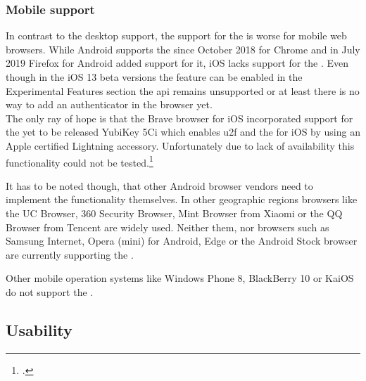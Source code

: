 \subsubsection{Mobile support}

In contrast to the desktop support, the support for the \wa{} is worse for mobile web browsers. While Android supports the \wa{} since October 2018 for Chrome and in July 2019 Firefox for Android added support for it, iOS lacks support for the \wa. Even though in the iOS 13 beta versions the feature can be enabled in the \frqq Experimental Features\flqq{} section the \gls{api} remains unsupported or at least there is no way to add an authenticator in the browser yet.\\
The only ray of hope is that the Brave browser for iOS incorporated support for the yet to be released YubiKey 5Ci which enables \gls{u2f} and the \wa{} for iOS by using an Apple certified Lightning accessory. Unfortunately due to lack of availability this functionality could not be tested.\footcite[See][]{brave-ios}

It has to be noted though, that other Android browser vendors need to implement the functionality themselves. In other geographic regions browsers like the UC Browser, 360 Security Browser, Mint Browser from Xiaomi or the QQ Browser from Tencent are widely used. Neither them, nor browsers such as Samsung Internet, Opera (mini) for Android, Edge or the Android Stock browser are currently supporting the \wa.

Other mobile operation systems like Windows Phone 8, BlackBerry 10 or KaiOS do not support the \wa.

\subsection{Usability}























